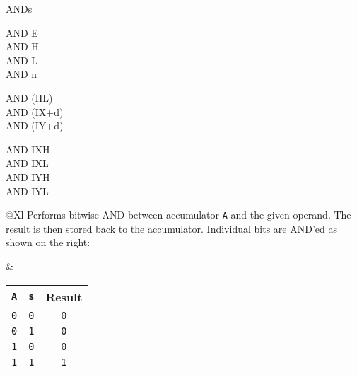 \begin{basedescript}{
	\desclabelstyle{\multilinelabel}
	\desclabelwidth{3cm}}
\begin{DetailItem}{AND}{s}
\begin{DetailVariants}[4]
			\columnbreak
			AND E\\
			AND H\\
			AND L\\
			AND n
			
			\columnbreak
			AND (HL)\\
			AND (IX+d)\\
			AND (IY+d)

			\columnbreak
			AND IXH\UNDOC\\
			AND IXL\UNDOC\\
			AND IYH\UNDOC\\
			AND IYL\UNDOC
		\end{DetailVariants}

		\begin{tabularx}{\linewidth}{@{}Xl}
			Performs bitwise AND between accumulator {\tt A} and the given operand. The result is then stored back to the accumulator. Individual bits are AND'ed as shown on the right:

			&

			\begin{tabular}[t]{cc|c}
				{\tt A} & {\tt s} & Result \\
				\hline
				{\tt 0} & {\tt 0} & {\tt 0} \\
				{\tt 0} & {\tt 1} & {\tt 0} \\
				{\tt 1} & {\tt 0} & {\tt 0} \\
				{\tt 1} & {\tt 1} & {\tt 1} \\
			\end{tabular}

			\\
		\end{tabularx}

		\begin{DetailEffects}[p]
			\FlagsANDr
		\end{DetailEffects}

		\begin{DetailEffectsFlags}
			\DetailFlagSF{\DetailFlagResultSign}
			\DetailFlagZF{\DetailFlagResultZero}
			\DetailFlagPV{\DetailFlagResultParity}
		\end{DetailEffectsFlags}

		\begin{DetailTiming}
		\end{DetailTiming}

	\end{DetailItem}


\end{basedescript}
